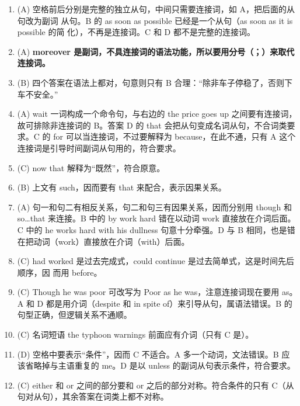 \begin{enumerate}

\item (A) 空格前后分别是完整的独立从句，中间只需要连接词，如 A，把后面的从句改为副词
  从句。B 的 as soon as possible 已经是一个从句（as soon as it is possible 的简
  化），不再是连接词。C 和 D 都不是完整的连接词。

\item (A) \textbf{moreover 是副词，不具连接词的语法功能，所以要用分号（；）来取代连接词。}

\item (B) 四个答案在语法上都对，句意则只有 B 合理：“除非车子停稳了，否则下车不安全。”

\item (A) wait 一词构成一个命令句，与右边的 the price goes up 之间要有连接词，故可排除非连接词的 B。答案 D 的 that 会把从句变成名词从句，不合词类要求。C 的 for 可以当连接词，不过要解释为 because，在此不通，只有 A 这个连接词是引导时间副词从句用的，符合要求。

\item (C) now that 解释为“既然”，符合原意。

\item (B) 上文有 such，因而要有 that 来配合，表示因果关系。

\item (A) 句一和句二有相反关系，句二和句三有因果关系，因而分别用 though 和 so…that 来连接。B 中的 by work hard 错在以动词 work 直接放在介词后面。C 中的 he works hard with his dullness 句意十分牵强。D 与 B 相同，也是错在把动词（work）直接放在介词（with）后面。

\item (C) had worked 是过去完成式，could continue 是过去简单式，这是时间先后顺序，因
  而用 before。

\item  (C) Though he was poor 可改写为 Poor as he was，注意连接词现在要用 as。A 和 D 都是用介词（despite 和 in spite of）来引导从句，属语法错误。B 的句型正确，但逻辑关系不通顺。

\item (C) 名词短语 the typhoon warnings 前面应有介词（只有 C 是）。

\item  (D) 空格中要表示“条件”，因而 C 不适合。A 多一个动词，文法错误。B 应该省略掉与主语重复的 me。D 是以 unless 的副词从句表示条件，符合要求。

\item  (C) either 和 or 之间的部分要和 or 之后的部分对称。符合条件的只有 C（从句对从句），其余答案在词类上都不对称。


\end{enumerate}
